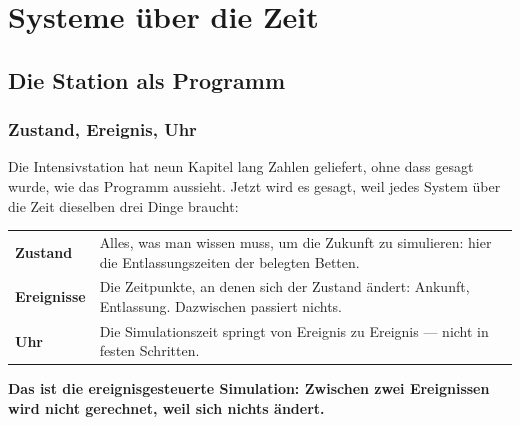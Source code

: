 \part{Systeme über die Zeit}

\chapter{Die Station als Programm}

\section{Zustand, Ereignis, Uhr}

\begin{merksatz}
Die Intensivstation hat neun Kapitel lang Zahlen geliefert, ohne dass gesagt wurde, wie das Programm aussieht. Jetzt wird es gesagt, weil jedes System über die Zeit dieselben drei Dinge braucht:

\begin{center}
{\small
\renewcommand{\arraystretch}{1.5}
\begin{tabular}{@{}P{2.4cm}P{6.4cm}@{}}
\toprule
\textbf{Zustand} & Alles, was man wissen muss, um die Zukunft zu simulieren: hier die Entlassungszeiten der belegten Betten.\\
\textbf{Ereignisse} & Die Zeitpunkte, an denen sich der Zustand ändert: Ankunft, Entlassung. Dazwischen passiert nichts.\\
\textbf{Uhr} & Die Simulationszeit springt von Ereignis zu Ereignis --- nicht in festen Schritten.\\
\bottomrule
\end{tabular}}
\end{center}

\begin{center}
\begin{minipage}{0.9\textwidth}
\textbf{Das ist die ereignisgesteuerte Simulation: Zwischen zwei Ereignissen wird nicht gerechnet, weil sich nichts ändert.}
\end{minipage}
\end{center}

\begin{center}
\begin{minipage}{0.88\textwidth}
\end{minipage}
\end{center}
\end{merksatz}

